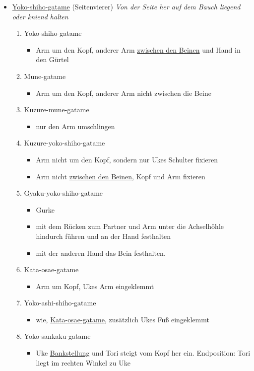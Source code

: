 \documentclass[justified, a4paper, notitlepage, captions=tableheading, nobib]{tufte-handout}
\begin{document}
\begin{itemize}
\item \hyperref[orgfa677b4]{Yoko-shiho-gatame} (Seitenvierer) 
\emph{Von der Seite her auf dem Bauch liegend oder kniend halten}

\begin{enumerate}
\item \label{orgfa677b4}Yoko-shiho-gatame        
\begin{itemize}
\item Arm um den Kopf, anderer Arm \hyperref[orga527e99]{zwischen den Beinen} und Hand in den Gürtel
\end{itemize}
\item \label{org064c91f}Mune-gatame              
\begin{itemize}
\item Arm um den Kopf, anderer Arm nicht zwischen die Beine
\end{itemize}
\item \label{org52ae5bb}Kuzure-mune-gatame       
\begin{itemize}
\item nur den Arm umschlingen
\end{itemize}
\item \label{org70854dd}Kuzure-yoko-shiho-gatame 
\begin{itemize}
\item Arm nicht um den Kopf, sondern nur Ukes Schulter fixieren
\item Arm nicht \hyperref[orga527e99]{zwischen den Beinen}, Kopf und Arm fixieren
\end{itemize}
\item \label{orgdf7e68e}Gyaku-yoko-shiho-gatame    
\begin{itemize}
\item \label{org9dde4a2}Gurke
\item mit dem Rücken zum Partner und Arm unter die Achselhöhle hindurch führen und an der Hand festhalten
\item mit der anderen Hand das Bein festhalten.
\end{itemize}
\item \label{orgdd762d9}Kata-osae-gatame        
\begin{itemize}
\item Arm um Kopf, Ukes Arm eingeklemmt
\end{itemize}
\item \label{org638590f}Yoko-ashi-shiho-gatame   
\begin{itemize}
\item wie, \hyperref[orgdd762d9]{Kata-osae-gatame}, zusätzlich Ukes Fuß eingeklemmt
\end{itemize}
\item \label{orga284efb}Yoko-sankaku-gatame      
\begin{itemize}
\item Uke \hyperref[orgf95c5ab]{Bankstellung} und Tori steigt vom Kopf her ein. Endposition: Tori liegt im rechten Winkel zu Uke
\end{itemize}
\end{enumerate}


\end{itemize}
\end{document}
